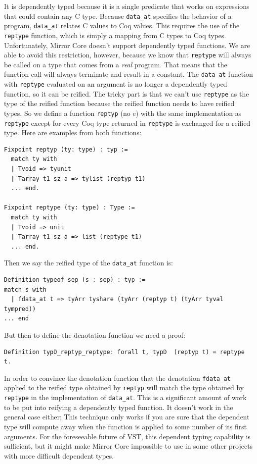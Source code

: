 \documentclass{puthesis}
\begin{document}
It is dependently typed because it is a single predicate that works on
expressions that could contain any C type. Because \lstinline|data_at|
specifies the behavior of a program, \lstinline|data_at| relates C
values to Coq values. This requires the use of the \lstinline|reptype|
function, which is simply a mapping from C types to Coq
types. Unfortunately, Mirror Core doesn't support dependently typed
functions. We are able to avoid this restriction, however, because we
know that \lstinline|reptype| will always be called on a type that
comes from a \emph{real} program. That means that the function call
will always terminate and result in a constant. The \lstinline|data_at|
function with \lstinline|reptype| evaluated on an argument is no
longer a dependently typed function, so it can be reified. The tricky
part is that we can't use \lstinline|reptype| as the type of the
reified function because the reified function needs to have reified
types. So we define a function \lstinline|reptyp| (no e) with the same
implementation as \lstinline|reptype| except for every Coq type
returned in \lstinline|reptype| is exchanged for a reified
type. Here are examples from both functions:

\begin{lstlisting}
Fixpoint reptyp (ty: type) : typ :=
  match ty with
  | Tvoid => tyunit
  | Tarray t1 sz a => tylist (reptyp t1)
  ... end.

Fixpoint reptype (ty: type) : Type :=
  match ty with
  | Tvoid => unit
  | Tarray t1 sz a => list (reptype t1)
  ... end.
\end{lstlisting}

Then we say the reified type of the \lstinline|data_at| function is:

\begin{lstlisting}
Definition typeof_sep (s : sep) : typ :=
match s with
  | fdata_at t => tyArr tyshare (tyArr (reptyp t) (tyArr tyval tympred))
... end
\end{lstlisting}

But then to define the denotation function we need a proof:

\begin{lstlisting}
Definition typD_reptyp_reptype: forall t, typD  (reptyp t) = reptype t.
\end{lstlisting}

In order to convince the denotation function that the denotation
\lstinline|fdata_at| applied to the reified type obtained by
\lstinline|reptyp| will match the type obtained by \lstinline|reptype|
in the implementation of \lstinline|data_at|. This is a significant
amount of work to be put into reifying a dependently typed
function. It doesn't work in the general case either; This technique
only works if you are sure that the dependent type will compute away
when the function is applied to some number of its first
arguments. For the foreseeable future of VST, this dependent typing
capability is sufficient, but it might make Mirror Core impossible to
use in some other projects with more difficult dependent types.
\end{document}

